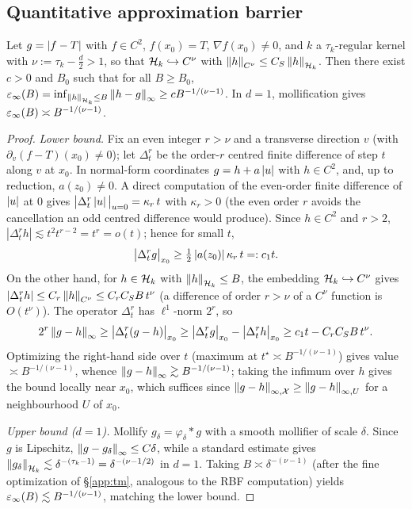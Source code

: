 \subsection{Quantitative approximation barrier}

\begin{theorem}
\label{app:thm-barrier-initial}
Let $g=\left\lvert f-T\right\rvert$ with $f\in C^2$, $f(x_0)=T$, $\nabla f(x_0)\neq0$, and $k$ a
$\tau_k$-regular kernel with $\nu:=\tau_k-\tfrac d2>1$, so that
$\mathcal{H}_k\hookrightarrow C^\nu$ with $\left\lVert h\right\rVert_{C^\nu}\le C_S\left\lVert h\right\rVert_{\mathcal{H}_k}$. Then there
exist $c>0$ and $B_0$ such that for all $B\ge B_0$,
$\varepsilon_{\infty}(B)=\inf_{\left\lVert h\right\rVert_{\mathcal{H}_k}\le B}\left\lVert h-g\right\rVert_\infty\ge cB^{-1/(\nu-1)}$. In $d=1$,
mollification gives $\varepsilon_{\infty}(B)\asymp B^{-1/(\nu-1)}$.
\end{theorem}

\begin{proof}
\emph{Lower bound.} Fix an even integer $r>\nu$ and a transverse direction $v$
(with $\partial_v(f-T)(x_0)\neq0$); let $\Delta_t^r$ be the order-$r$ centred
finite difference of step $t$ along $v$ at $x_0$. In normal-form coordinates
$g=h+a\left\lvert u\right\rvert$ with $h\in C^2$, and, up to reduction, $a(z_0)\neq0$. A direct
computation of the even-order finite difference of $\left\lvert u\right\rvert$ at $0$ gives
$\big|\Delta_t^r\left\lvert u\right\rvert\big|_{u=0}=\kappa_r\,t$ with $\kappa_r>0$ (the even order
$r$ avoids the cancellation an odd centred difference would produce). Since
$h\in C^2$ and $r>2$, $|\Delta_t^r h|\lesssim t^2 t^{r-2}=t^r=o(t)$; hence for
small $t$,
\[
\big|\Delta_t^r g\big|_{x_0}\ge\tfrac12\left\lvert a(z_0)\right\rvert\kappa_r\,t=:c_1 t .
\]
On the other hand, for $h\in\mathcal{H}_k$ with $\left\lVert h\right\rVert_{\mathcal{H}_k}\le B$, the embedding
$\mathcal{H}_k\hookrightarrow C^\nu$ gives
$|\Delta_t^r h|\le C_r\left\lVert h\right\rVert_{C^\nu}\le C_r C_S B\,t^\nu$ (a difference of order
$r>\nu$ of a $C^\nu$ function is $O(t^\nu)$). The operator $\Delta_t^r$ has
$\ell^1$-norm $2^r$, so
\[
2^r\left\lVert g-h\right\rVert_\infty\ge\big|\Delta_t^r(g-h)\big|_{x_0}
\ge\big|\Delta_t^r g\big|_{x_0}-\big|\Delta_t^r h\big|_{x_0}
\ge c_1 t-C_r C_S B\,t^\nu .
\]
Optimizing the right-hand side over $t$ (maximum at $t^\star\asymp B^{-1/(\nu-1)}$)
gives value $\asymp B^{-1/(\nu-1)}$, whence $\left\lVert g-h\right\rVert_\infty\gtrsim
B^{-1/(\nu-1)}$; taking the infimum over $h$ gives the bound locally near $x_0$,
which suffices since $\left\lVert g-h\right\rVert_{\infty,\mathcal{X}}\ge\left\lVert g-h\right\rVert_{\infty,U}$ for a
neighbourhood $U$ of $x_0$.

\emph{Upper bound ($d=1$).} Mollify $g_\delta=\varphi_\delta*g$ with a smooth
mollifier of scale $\delta$. Since $g$ is Lipschitz, $\left\lVert g-g_\delta\right\rVert_\infty\le
C\delta$, while a standard estimate gives
$\left\lVert g_\delta\right\rVert_{\mathcal{H}_k}\lesssim\delta^{-(\tau_k-1)}=\delta^{-(\nu-1/2)}$ in $d=1$.
Taking $B\asymp\delta^{-(\nu-1)}$ (after the fine optimization of
\S\ref{app:tm}, analogous to the RBF computation) yields
$\varepsilon_{\infty}(B)\lesssim B^{-1/(\nu-1)}$, matching the lower bound.
\end{proof}


